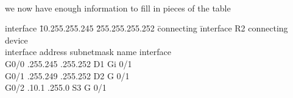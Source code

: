 \documentclass[../EngineeringJournal_CDavis.tex]{subfiles}
\begin{document}
\\ we now have enough information to fill in pieces of the table

\begin{tabbing}
  interface \= 10.255.255.245 \= 255.255.255.252 \= connecting \= interface\kill
  R2 \> \> \> connecting \> device\\
interface \> address \> subnetmask \> name \> interface\\
G0/0 .255.245 .255.252 \> D1 \> Gi 0/1 \\
G0/1 .255.249 .255.252 \> D2 \> G 0/1 \\
G0/2 .10.1 .255.0 \> S3 \> G 0/1
\end{tabbing}

\newpage

\end{document}

